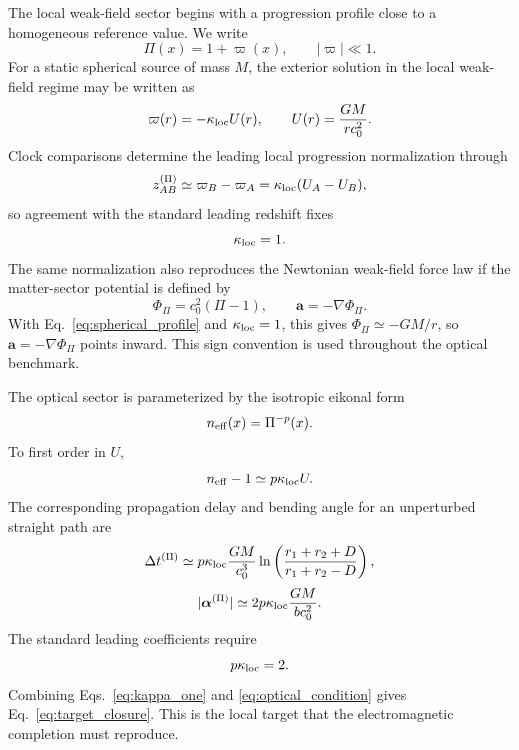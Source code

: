 \documentclass[12pt]{article}
\begin{document}
The local weak-field sector begins with a progression profile close to a homogeneous reference value.  We write
\begin{equation}
 \Pi(x)=1+\varpi(x),\qquad |\varpi|\ll 1.
\label{eq:Pi_weak}
\end{equation}
For a static spherical source of mass $M$, the exterior solution in the local weak-field regime may be written as
\begin{equation}
 \varpi(r)=-\kappa_{\rm loc}U(r),\qquad U(r)=\frac{GM}{r c_0^2}.
\label{eq:spherical_profile}
\end{equation}
Clock comparisons determine the leading local progression normalization through
\begin{equation}
 z_{AB}^{(\Pi)}\simeq \varpi_B-\varpi_A
      =\kappa_{\rm loc}(U_A-U_B),
\label{eq:clock_shift}
\end{equation}
so agreement with the standard leading redshift fixes
\begin{equation}
 \kappa_{\rm loc}=1.
\label{eq:kappa_one}
\end{equation}
The same normalization also reproduces the Newtonian weak-field force law if the matter-sector potential is defined by
\begin{equation}
 \Phi_\Pi=c_0^2(\Pi-1),\qquad \mathbf a=-\nabla\Phi_\Pi.
\label{eq:matter_potential}
\end{equation}
With Eq.~\eqref{eq:spherical_profile} and \(\kappa_{\rm loc}=1\), this gives \(\Phi_\Pi\simeq-GM/r\), so \(\mathbf a=-\nabla\Phi_\Pi\) points inward.  This sign convention is used throughout the optical benchmark.

The optical sector is parameterized by the isotropic eikonal form
\begin{equation}
 n_{\rm eff}(x)=\Pi^{-p}(x).
\label{eq:p_param}
\end{equation}
To first order in $U$,
\begin{equation}
 n_{\rm eff}-1\simeq p\kappa_{\rm loc}U.
\label{eq:index_weak}
\end{equation}
The corresponding propagation delay and bending angle for an unperturbed straight path are
\begin{equation}
 \Delta t^{(\Pi)}\simeq p\kappa_{\rm loc}\frac{GM}{c_0^3}
 \ln\left(\frac{r_1+r_2+D}{r_1+r_2-D}\right),
\label{eq:delay_benchmark}
\end{equation}
\begin{equation}
 |\boldsymbol\alpha^{(\Pi)}|\simeq 2p\kappa_{\rm loc}\frac{GM}{b c_0^2}.
\label{eq:deflection_benchmark}
\end{equation}
The standard leading coefficients require
\begin{equation}
 p\kappa_{\rm loc}=2.
\label{eq:optical_condition}
\end{equation}
Combining Eqs.~\eqref{eq:kappa_one} and \eqref{eq:optical_condition} gives Eq.~\eqref{eq:target_closure}.  This is the local target that the electromagnetic completion must reproduce.
\end{document}
